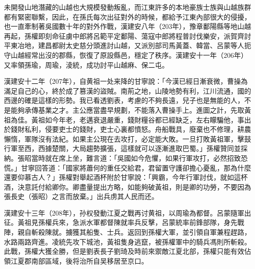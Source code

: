 未開發山地潛藏的山越也大規模發動叛亂，而江東許多的本地豪族士族與山越族群都有緊密聯繫，因此，在孫氏每次出征對外的時候，都給予江東內部很大的侵擾，也一直牽制著吳國數十年的對外作戰，漢建安八年（203年），豫章鄱陽縣等地山越再起，孫權即刻命征虜中郎將呂範平定鄱陽、蕩寇中郎將程普討伐樂安，派賀齊討平東冶地，建昌都尉太史慈分頭進討山越，又派別部司馬黃蓋、韓當、呂蒙等人扼守山越經常出沒的郡縣，恢復了原設縣邑，穩定了秩序。漢建安十一年（206年）又率領孫瑜，周瑜，淩統，成功討平山越麻、保二屯。

漢建安十二年（207年），自黄祖一处来降的甘寧說：「今漢已經日漸衰微，曹操為滿足自己的心，終於成了篡漢的盜賊。南荊之地，山陵地勢有利，江川流通，國的西邊的確是這樣的形勢。我已看透劉表，考慮的不夠長遠，兒子也是無能的人，不是能夠承傳基業之才。主公應當盡早規劃，不能落入曹操手上。進圖之計，先取黃祖為佳。黃祖如今年老，老邁衰退嚴重，錢財糧谷都已經缺乏，左右矇騙他，事出於錢財私利，侵要吏士的錢財，吏士心裏都憤怒。舟船戰具，廢棄也不修理，耕農懶惰，軍隊沒有法紀。如果主公現在去攻打，必定能大敗。一旦打敗黃祖軍，擊鼓行軍至西，西據楚關，大局趨勢擴張，這樣就可以逐漸進取巴蜀。」孫權贊同並採納。張昭當時就在席上坐，難言道：「吳國如今危懼，如果行軍攻打，必然招致恐慌。」甘寧回答道：「國家將蕭何的重任交給君，君留置守護卻擔心憂亂，那為什麼還要仰慕古人？」孫權對舉起酒杯附於甘寧說：「興霸，今年行軍討伐，就如這杯酒，決意託付給卿你。卿盡量提出方略，如能夠破黃祖，則是卿的功勞，不要因為張長史（張昭）之言而放棄。」出兵虏其人民而还。

漢建安十三年（208年），孙权發動江夏之戰再讨黄祖，以周瑜為都督。呂蒙隨軍出征。黃祖見孫權兵來，急派水軍都督陳就率兵反擊，呂蒙統率前鋒部隊，身先戰陣，親自斬殺陳就。擄獲其船隻、士兵。返回到孫權大軍，並引領自軍兼程趕路，水路兩路齊進。凌統先攻下城池，黃祖隻身逃竄，被孫權軍中的騎兵馮則所斬殺。此戰，孫權大獲全勝，但是劉表長子劉琦及時前來禦敵江夏北部，孫權只能有效佔領江夏郡南部區域，後将治所自吴移居至京口。

